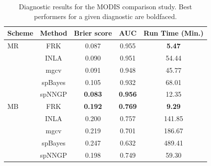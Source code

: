 \documentclass[article]{jss}
\begin{document}
\begin{table}
    \centering
    \caption{Diagnostic results for the MODIS comparison study. Best performers for a given diagnostic are boldfaced.}
    \label{tab:summary_of_analyses}
    \begin{tabular}{lcccc}
    \hline
   Scheme &  Method  & Brier score & AUC &  Run Time (Min.) \\
   \hline
  MR & FRK & 0.087 & 0.955 & \textbf{5.47} \\ 
   & INLA & 0.090 & 0.951 & 54.44 \\ 
   & mgcv & 0.091 & 0.948 & 45.77 \\ 
   & spBayes & 0.105 & 0.932 & 68.01 \\ 
   & spNNGP & \textbf{0.083} & \textbf{0.956} & 12.35 \\  
   \hline 
MB & FRK & \textbf{0.192} & \textbf{0.769} & \textbf{9.29} \\ 
   & INLA & 0.200 & 0.757 & 141.85 \\ 
   & mgcv & 0.219 & 0.701 & 186.67 \\ 
   & spBayes & 0.247 & 0.632 & 489.41 \\ 
   & spNNGP & 0.198 & 0.749 & 59.30 \\     
   \hline    
  \end{tabular}
\end{table}
 
\end{document}
